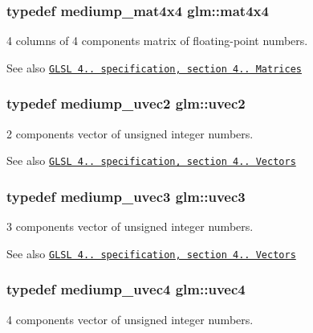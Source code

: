 \subsubsection[{mat4x4}]{\setlength{\rightskip}{0pt plus 5cm}typedef mediump\+\_\+mat4x4 {\bf glm\+::mat4x4}}\label{group__core__types_gafe3341c717b9f9725019a10fd1dcf9c1}
4 columns of 4 components matrix of floating-\/point numbers.

\begin{DoxySeeAlso}{See also}
\href{http://www.opengl.org/registry/doc/GLSLangSpec.4.20.8.pdf}{\tt G\+L\+S\+L 4.. specification, section 4.. Matrices} 
\end{DoxySeeAlso}
\hypertarget{group__core__types_gad0643cb47b927024ccf4979b0e9a903d}{}
\subsubsection[{uvec2}]{\setlength{\rightskip}{0pt plus 5cm}typedef mediump\+\_\+uvec2 {\bf glm\+::uvec2}}\label{group__core__types_gad0643cb47b927024ccf4979b0e9a903d}
2 components vector of unsigned integer numbers.

\begin{DoxySeeAlso}{See also}
\href{http://www.opengl.org/registry/doc/GLSLangSpec.4.20.8.pdf}{\tt G\+L\+S\+L 4.. specification, section 4.. Vectors} 
\end{DoxySeeAlso}
\hypertarget{group__core__types_ga713379218af0a01d0a7b1e631066106c}{}
\subsubsection[{uvec3}]{\setlength{\rightskip}{0pt plus 5cm}typedef mediump\+\_\+uvec3 {\bf glm\+::uvec3}}\label{group__core__types_ga713379218af0a01d0a7b1e631066106c}
3 components vector of unsigned integer numbers.

\begin{DoxySeeAlso}{See also}
\href{http://www.opengl.org/registry/doc/GLSLangSpec.4.20.8.pdf}{\tt G\+L\+S\+L 4.. specification, section 4.. Vectors} 
\end{DoxySeeAlso}
\hypertarget{group__core__types_gae85130f09c272fcd64da1353c09dddef}{}
\subsubsection[{uvec4}]{\setlength{\rightskip}{0pt plus 5cm}typedef mediump\+\_\+uvec4 {\bf glm\+::uvec4}}\label{group__core__types_gae85130f09c272fcd64da1353c09dddef}
4 components vector of unsigned integer numbers.

